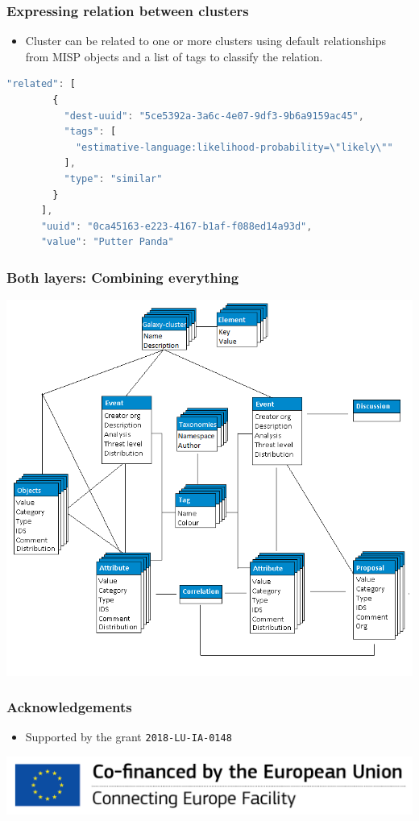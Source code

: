\begin{frame}[fragile]
        \frametitle{Expressing relation between clusters}
        \begin{itemize}
                \item Cluster can be related to one or more clusters using default relationships from MISP objects and a list of tags to classify the relation.
        \end{itemize}

        \begin{lstlisting}[language=javascript,firstnumber=1]
        "related": [
        {
          "dest-uuid": "5ce5392a-3a6c-4e07-9df3-9b6a9159ac45",
          "tags": [
            "estimative-language:likelihood-probability=\"likely\""
          ],
          "type": "similar"
        }
      ],
      "uuid": "0ca45163-e223-4167-b1af-f088ed14a93d",
      "value": "Putter Panda"
        \end{lstlisting}
\end{frame}

\begin{frame}
    \frametitle{Both layers: Combining everything}
    \begin{center}
        \includegraphics[width=0.75\linewidth]{screenshots/datamodel8.png}
    \end{center}
\end{frame}

\begin{frame}
    \frametitle{Acknowledgements}
    \begin{itemize}
        \item Supported by the grant \texttt{2018-LU-IA-0148}
    \end{itemize}
    \begin{center}
        \includegraphics[scale=0.7]{en_cef.png}
    \end{center}
\end{frame}
